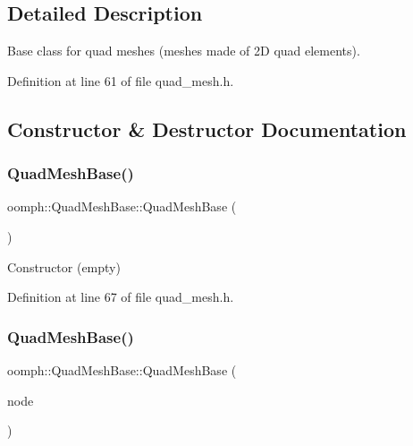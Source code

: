 \subsection{Detailed Description}
Base class for quad meshes (meshes made of 2D quad elements). 

Definition at line 61 of file quad\+\_\+mesh.\+h.



\subsection{Constructor \& Destructor Documentation}
\mbox{\label{classoomph_1_1QuadMeshBase_a56c68363a134866e636f8aa4a8a29de9}} 
\subsubsection{\texorpdfstring{Quad\+Mesh\+Base()}{QuadMeshBase()}\hspace{0.1cm}{\footnotesize\ttfamily [1/2]}}
{\footnotesize\ttfamily oomph\+::\+Quad\+Mesh\+Base\+::\+Quad\+Mesh\+Base (\begin{DoxyParamCaption}{ }\end{DoxyParamCaption})\hspace{0.3cm}{\ttfamily [inline]}}



Constructor (empty) 



Definition at line 67 of file quad\+\_\+mesh.\+h.

\mbox{\label{classoomph_1_1QuadMeshBase_a4b12180211307b053d398eff9c7afcb0}} 
\subsubsection{\texorpdfstring{Quad\+Mesh\+Base()}{QuadMeshBase()}\hspace{0.1cm}{\footnotesize\ttfamily [2/2]}}
{\footnotesize\ttfamily oomph\+::\+Quad\+Mesh\+Base\+::\+Quad\+Mesh\+Base (\begin{DoxyParamCaption}\item[{const \hyperlink{classoomph_1_1QuadMeshBase}{Quad\+Mesh\+Base} \&}]{node }\end{DoxyParamCaption})\hspace{0.3cm}{\ttfamily [inline]}}



